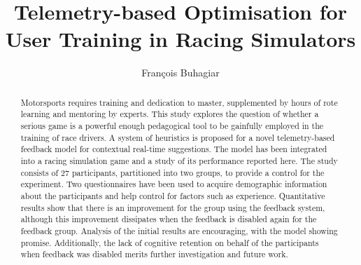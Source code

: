 \documentclass{sig-alternate}
\begin{document}
\title{Telemetry-based Optimisation for User Training in Racing Simulators}

\author{
	\alignauthor
	Fran\c{c}ois Buhagiar\\
}

\maketitle
\begin{abstract}

Motorsports requires training and dedication to master, supplemented by hours of rote learning and mentoring by experts. This study explores the question of whether a serious game is a powerful enough pedagogical tool to be gainfully employed in the training of race drivers. A system of heuristics is proposed for a novel telemetry-based feedback model for contextual real-time suggestions. The model has been integrated into a racing simulation game and a study of its performance reported here. The study consists of 27 participants, partitioned into two groups, to provide a control for the experiment. Two questionnaires have been used to acquire demographic information about the participants and help control for factors such as experience. Quantitative results show that there is an improvement for the group using the feedback system, although this improvement dissipates when the feedback is disabled again for the feedback group. Analysis of the initial results are encouraging, with the model showing promise. Additionally, the lack of cognitive retention on behalf of the participants when feedback was disabled merits further investigation and future work.

\end{abstract}


\def \methodname {TeAR\xspace}
\def \methodnamefull {Telemetry Assisted Racing\xspace}
\end{document}
